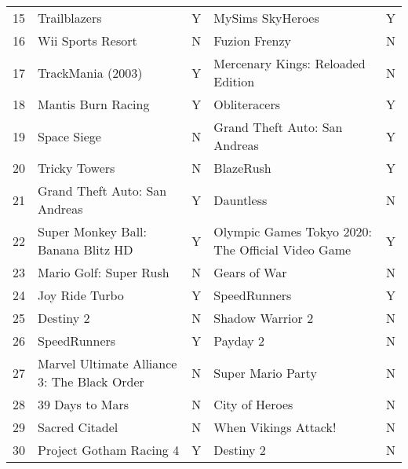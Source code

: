 \begin{tabular}{rllll}
   15 &                                Trailblazers &         Y &                                  MySims SkyHeroes &         Y \\
   16 &                           Wii Sports Resort &         N &                                     Fuzion Frenzy &         N \\
   17 &                           TrackMania (2003) &         Y &                 Mercenary Kings: Reloaded Edition &         N \\
   18 &                          Mantis Burn Racing &         Y &                                      Obliteracers &         Y \\
   19 &                                 Space Siege &         N &                     Grand Theft Auto: San Andreas &         Y \\
   20 &                               Tricky Towers &         N &                                         BlazeRush &         Y \\
   21 &               Grand Theft Auto: San Andreas &         Y &                                         Dauntless &         N \\
   22 &          Super Monkey Ball: Banana Blitz HD &         Y & Olympic Games Tokyo 2020: The Official Video Game &         Y \\
   23 &                      Mario Golf: Super Rush &         N &                                      Gears of War &         N \\
   24 &                              Joy Ride Turbo &         Y &                                      SpeedRunners &         Y \\
   25 &                                   Destiny 2 &         N &                                  Shadow Warrior 2 &         N \\
   26 &                                SpeedRunners &         Y &                                          Payday 2 &         N \\
   27 & Marvel Ultimate Alliance 3: The Black Order &         N &                                 Super Mario Party &         N \\
   28 &                             39 Days to Mars &         N &                                    City of Heroes &         N \\
   29 &                              Sacred Citadel &         N &                              When Vikings Attack! &         N \\
   30 &                     Project Gotham Racing 4 &         Y &                                         Destiny 2 &         N \\
\bottomrule
\end{tabular}
